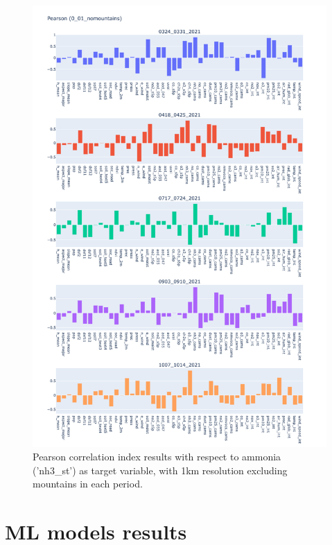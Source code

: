\begin{figure}[H]
    \centering
    \includegraphics[scale=0.38]{images/tests/0_01_nomountainsnh3_st_pearson.png}
    \caption{Pearson correlation index results with respect to ammonia ('nh3\_st') as target variable, with 1km resolution excluding mountains in each period.}
    
\end{figure}

\section{ML models results}
